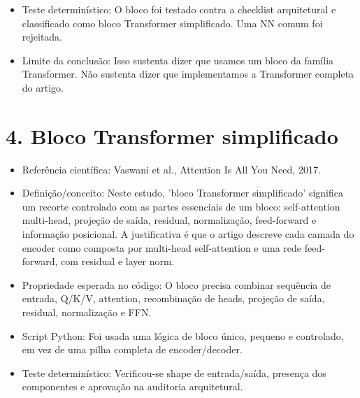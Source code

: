 \begin{itemize}
\item Teste determinístico:
O bloco foi testado contra a checklist arquitetural e classificado como bloco
Transformer simplificado. Uma NN comum foi rejeitada.
\end{itemize}

\begin{itemize}
\item Limite da conclusão:
Isso sustenta dizer que usamos um bloco da família Transformer. Não sustenta
dizer que implementamos a Transformer completa do artigo.
\end{itemize}



\section{4. Bloco Transformer simplificado}


\begin{itemize}
\item Referência científica:
Vaswani et al., Attention Is All You Need, 2017.
\end{itemize}

\begin{itemize}
\item Definição/conceito:
Neste estudo, 'bloco Transformer simplificado' significa um recorte controlado
com as partes essenciais de um bloco: self-attention multi-head, projeção de
saída, residual, normalização, feed-forward e informação posicional. A
justificativa é que o artigo descreve cada camada do encoder como composta por
multi-head self-attention e uma rede feed-forward, com residual e layer norm.
\end{itemize}

\begin{itemize}
\item Propriedade esperada no código:
O bloco precisa combinar sequência de entrada, Q/K/V, attention, recombinação
de heads, projeção de saída, residual, normalização e FFN.
\end{itemize}

\begin{itemize}
\item Script Python:
Foi usada uma lógica de bloco único, pequeno e controlado, em vez de uma pilha
completa de encoder/decoder.
\end{itemize}

\begin{itemize}
\item Teste determinístico:
Verificou-se shape de entrada/saída, presença dos componentes e aprovação na
auditoria arquitetural.
\end{itemize}

